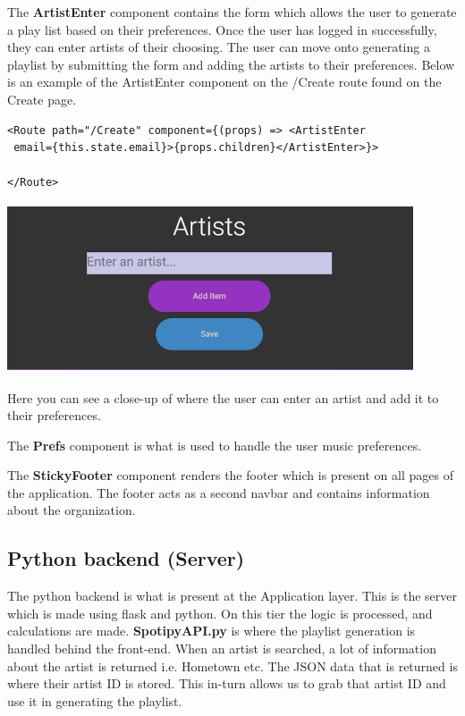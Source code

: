 The \textbf{ArtistEnter} component contains the form which allows the user to generate a play list based on their preferences. Once the user has logged in successfully, they can enter artists of their choosing. The user can move onto generating a playlist by submitting the form and adding the artists to their preferences.\newline
Below is an example of the ArtistEnter component on the /Create route found on the Create page.\newline
\begin{verbatim} 
<Route path="/Create" component={(props) => <ArtistEnter
 email={this.state.email}>{props.children}</ArtistEnter>}>
 
</Route>
\end{verbatim}



\begin{center}    
	\includegraphics[width=12cm, height=5cm]{img/AddArtist.png}
\end{center}
Here you can see a close-up of where the user can enter an artist and add it to their preferences.\newline


The \textbf{Prefs} component is what is used to handle the user music preferences.\newline

The \textbf{StickyFooter} component renders the footer which is present on all pages of the application. The footer acts as a second navbar and contains information about the organization.\newline

\subsection{Python backend (Server)}
The python backend is what is present at the Application layer. This is the server which is made using flask and python. On this tier the logic is processed, and calculations are made.
\textbf{SpotipyAPI.py} is where the playlist generation is handled behind the front-end. When an artist is searched, a lot of information about the artist is returned i.e. Hometown etc.
The JSON data that is returned is where their artist ID is stored. This in-turn allows us to grab that artist ID and use it in generating the playlist.\newline

